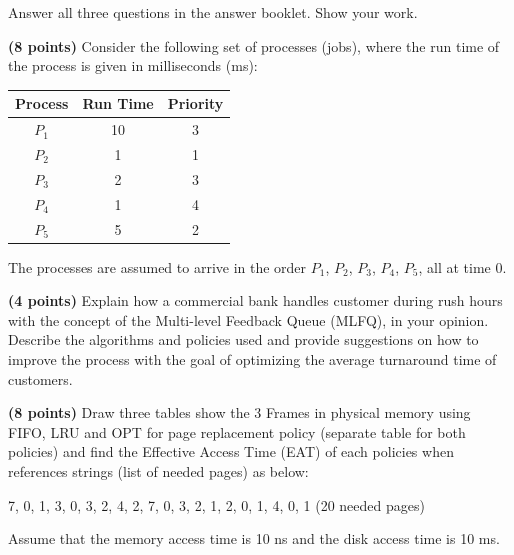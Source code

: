 \begingroup\small
\noindent Answer all three questions in the answer booklet. Show your work.\par\smallskip
\begin{questions}
\question \textbf{(8 points)} Consider the following set of processes (jobs), where the run time of the process is given in milliseconds (ms):
\begin{center}
\renewcommand{\arraystretch}{1.0}
\begin{tabular}{c|c|c}
Process & Run Time & Priority \\\hline
$P_1$ & 10 & 3 \\
$P_2$ & 1 & 1 \\
$P_3$ & 2 & 3 \\
$P_4$ & 1 & 4 \\
$P_5$ & 5 & 2
\end{tabular}
\end{center}
The processes are assumed to arrive in the order $P_1$, $P_2$, $P_3$, $P_4$, $P_5$, all at time 0.

\question \textbf{(4 points)} Explain how a commercial bank handles customer during rush hours with the concept of the Multi-level Feedback Queue (MLFQ), in your opinion. Describe the algorithms and policies used and provide suggestions on how to improve the process with the goal of optimizing the average turnaround time of customers.

\question \textbf{(8 points)} Draw three tables show the 3 Frames in physical memory using FIFO, LRU and OPT for page replacement policy (separate table for both policies) and find the Effective Access Time (EAT) of each policies when references strings (list of needed pages) as below:
\begin{center}
7, 0, 1, 3, 0, 3, 2, 4, 2, 7, 0, 3, 2, 1, 2, 0, 1, 4, 0, 1 (20 needed pages)
\end{center}
Assume that the memory access time is 10 ns and the disk access time is 10 ms.
\end{questions}
\endgroup\vfill\newpage
\null\vfill\newpage
\null\vfill
